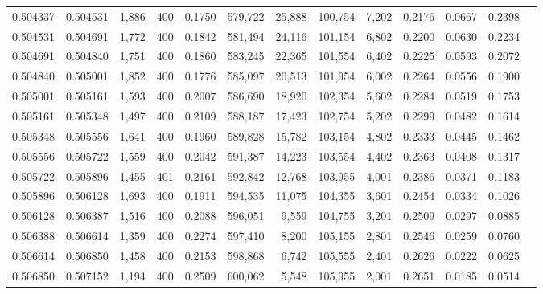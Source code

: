 \begin{tabular}{rrrrrrrrrrrrr}
0.504337 & 0.504531 & 1,886 & 400 &                                     0.1750 & 579,722 &  25,888 & 100,754 &   7,202 & 0.2176 & 0.0667 & 0.2398 \\
0.504531 & 0.504691 & 1,772 & 400 &                                     0.1842 & 581,494 &  24,116 & 101,154 &   6,802 & 0.2200 & 0.0630 & 0.2234 \\
0.504691 & 0.504840 & 1,751 & 400 &                                     0.1860 & 583,245 &  22,365 & 101,554 &   6,402 & 0.2225 & 0.0593 & 0.2072 \\
0.504840 & 0.505001 & 1,852 & 400 &                                     0.1776 & 585,097 &  20,513 & 101,954 &   6,002 & 0.2264 & 0.0556 & 0.1900 \\
0.505001 & 0.505161 & 1,593 & 400 &                                     0.2007 & 586,690 &  18,920 & 102,354 &   5,602 & 0.2284 & 0.0519 & 0.1753 \\
0.505161 & 0.505348 & 1,497 & 400 &                                     0.2109 & 588,187 &  17,423 & 102,754 &   5,202 & 0.2299 & 0.0482 & 0.1614 \\
0.505348 & 0.505556 & 1,641 & 400 &                                     0.1960 & 589,828 &  15,782 & 103,154 &   4,802 & 0.2333 & 0.0445 & 0.1462 \\
0.505556 & 0.505722 & 1,559 & 400 &                                     0.2042 & 591,387 &  14,223 & 103,554 &   4,402 & 0.2363 & 0.0408 & 0.1317 \\
0.505722 & 0.505896 & 1,455 & 401 &                                     0.2161 & 592,842 &  12,768 & 103,955 &   4,001 & 0.2386 & 0.0371 & 0.1183 \\
0.505896 & 0.506128 & 1,693 & 400 &                                     0.1911 & 594,535 &  11,075 & 104,355 &   3,601 & 0.2454 & 0.0334 & 0.1026 \\
0.506128 & 0.506387 & 1,516 & 400 &                                     0.2088 & 596,051 &   9,559 & 104,755 &   3,201 & 0.2509 & 0.0297 & 0.0885 \\
0.506388 & 0.506614 & 1,359 & 400 &                                     0.2274 & 597,410 &   8,200 & 105,155 &   2,801 & 0.2546 & 0.0259 & 0.0760 \\
0.506614 & 0.506850 & 1,458 & 400 &                                     0.2153 & 598,868 &   6,742 & 105,555 &   2,401 & 0.2626 & 0.0222 & 0.0625 \\
0.506850 & 0.507152 & 1,194 & 400 &                                     0.2509 & 600,062 &   5,548 & 105,955 &   2,001 & 0.2651 & 0.0185 & 0.0514 \\

\end{tabular}
